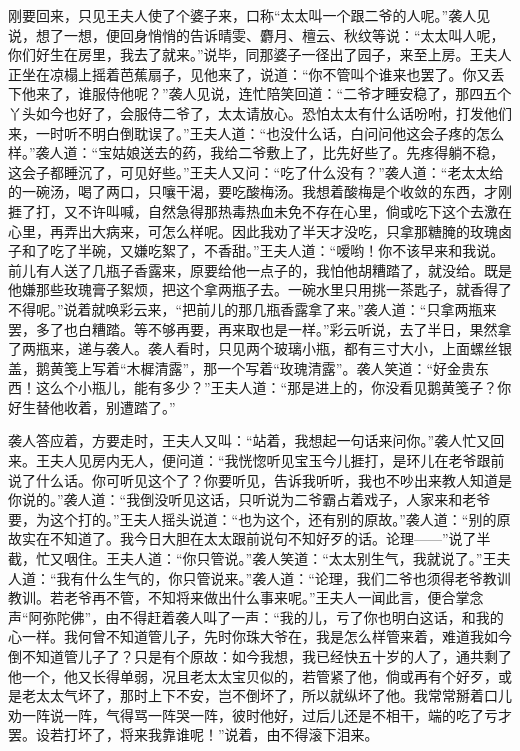 \documentclass[12pt,oneside]{book}
\begin{document}
刚要回来，只见王夫人使了个婆子来，口称“太太叫一个跟二爷的人呢。”袭人见说，想了一想，便回身悄悄的告诉晴雯、麝月、檀云、秋纹等说：“太太叫人呢，你们好生在房里，我去了就来。”说毕，同那婆子一径出了园子，来至上房。王夫人正坐在凉榻上摇着芭蕉扇子，见他来了，说道：“你不管叫个谁来也罢了。你又丢下他来了，谁服侍他呢？”袭人见说，连忙陪笑回道：“二爷才睡安稳了，那四五个丫头如今也好了，会服侍二爷了，太太请放心。恐怕太太有什么话吩咐，打发他们来，一时听不明白倒耽误了。”王夫人道：“也没什么话，白问问他这会子疼的怎么样。”袭人道：“宝姑娘送去的药，我给二爷敷上了，比先好些了。先疼得躺不稳，这会子都睡沉了，可见好些。”王夫人又问：“吃了什么没有？”袭人道：“老太太给的一碗汤，喝了两口，只嚷干渴，要吃酸梅汤。我想着酸梅是个收敛的东西，才刚捱了打，又不许叫喊，自然急得那热毒热血未免不存在心里，倘或吃下这个去激在心里，再弄出大病来，可怎么样呢。因此我劝了半天才没吃，只拿那糖腌的玫瑰卤子和了吃了半碗，又嫌吃絮了，不香甜。”王夫人道：“嗳哟！你不该早来和我说。前儿有人送了几瓶子香露来，原要给他一点子的，我怕他胡糟踏了，就没给。既是他嫌那些玫瑰膏子絮烦，把这个拿两瓶子去。一碗水里只用挑一茶匙子，就香得了不得呢。”说着就唤彩云来，“把前儿的那几瓶香露拿了来。”袭人道：“只拿两瓶来罢，多了也白糟踏。等不够再要，再来取也是一样。”彩云听说，去了半日，果然拿了两瓶来，递与袭人。袭人看时，只见两个玻璃小瓶，都有三寸大小，上面螺丝银盖，鹅黄笺上写着“木樨清露”，那一个写着“玫瑰清露”。袭人笑道：“好金贵东西！这么个小瓶儿，能有多少？”王夫人道：“那是进上的，你没看见鹅黄笺子？你好生替他收着，别遭踏了。”

袭人答应着，方要走时，王夫人又叫：“站着，我想起一句话来问你。”袭人忙又回来。王夫人见房内无人，便问道：“我恍惚听见宝玉今儿捱打，是环儿在老爷跟前说了什么话。你可听见这个了？你要听见，告诉我听听，我也不吵出来教人知道是你说的。”袭人道：“我倒没听见这话，只听说为二爷霸占着戏子，人家来和老爷要，为这个打的。”王夫人摇头说道：“也为这个，还有别的原故。”袭人道：“别的原故实在不知道了。我今日大胆在太太跟前说句不知好歹的话。论理——”说了半截，忙又咽住。王夫人道：“你只管说。”袭人笑道：“太太别生气，我就说了。”王夫人道：“我有什么生气的，你只管说来。”袭人道：“论理，我们二爷也须得老爷教训教训。若老爷再不管，不知将来做出什么事来呢。”王夫人一闻此言，便合掌念声“阿弥陀佛”，由不得赶着袭人叫了一声：“我的儿，亏了你也明白这话，和我的心一样。我何曾不知道管儿子，先时你珠大爷在，我是怎么样管来着，难道我如今倒不知道管儿子了？只是有个原故：如今我想，我已经快五十岁的人了，通共剩了他一个，他又长得单弱，况且老太太宝贝似的，若管紧了他，倘或再有个好歹，或是老太太气坏了，那时上下不安，岂不倒坏了，所以就纵坏了他。我常常掰着口儿劝一阵说一阵，气得骂一阵哭一阵，彼时他好，过后儿还是不相干，端的吃了亏才罢。设若打坏了，将来我靠谁呢！”说着，由不得滚下泪来。
\end{document}

